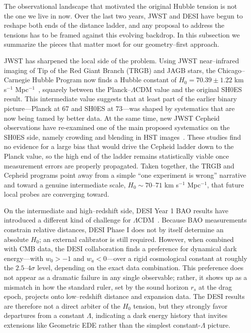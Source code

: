 \documentclass[a4paper,11pt]{article}
\begin{document}
The observational landscape that motivated the original Hubble tension is not the one we live in now. Over the last two years, JWST and DESI have begun to reshape both ends of the distance ladder, and any proposal to address the tensions has to be framed against this evolving backdrop. In this subsection we summarize the pieces that matter most for our geometry--first approach.

JWST has sharpened the local side of the problem. Using JWST near--infrared imaging of Tip of the Red Giant Branch (TRGB) and JAGB stars, the Chicago--Carnegie Hubble Program now finds a Hubble constant of $H_0 = 70.39 \pm 1.22$ km s$^{-1}$ Mpc$^{-1}$~\cite{Freedman2024}, squarely between the Planck--$\Lambda$CDM value and the original SH0ES result. This intermediate value suggests that at least part of the earlier binary picture---Planck at 67 and SH0ES at 73---was shaped by systematics that are now being tamed by better data. At the same time, new JWST Cepheid observations have re-examined one of the main proposed systematics on the SH0ES side, namely crowding and blending in HST images~\cite{Riess_JWST}. These studies find no evidence for a large bias that would drive the Cepheid ladder down to the Planck value, so the high end of the ladder remains statistically viable once measurement errors are properly propagated. Taken together, the TRGB and Cepheid programs point away from a simple ``one experiment is wrong'' narrative and toward a genuine intermediate scale, $H_0 \sim 70$--$71$ km s$^{-1}$ Mpc$^{-1}$, that future local probes are converging toward.

On the intermediate and high--redshift side, DESI Year 1 BAO results have introduced a different kind of challenge for $\Lambda$CDM~\cite{DESI2024,DESI_cosmo}. Because BAO measurements constrain relative distances, DESI Phase I does not by itself determine an absolute $H_0$; an external calibrator is still required. However, when combined with CMB data, the DESI collaboration finds a preference for dynamical dark energy---with $w_0 > -1$ and $w_a < 0$---over a rigid cosmological constant at roughly the $2.5$--$4\sigma$ level, depending on the exact data combination. This preference does not appear as a dramatic failure in any single observable; rather, it shows up as a mismatch in how the standard ruler, set by the sound horizon $r_s$ at the drag epoch, projects onto low--redshift distance and expansion data. The DESI results are therefore not a direct arbiter of the $H_0$ tension, but they strongly favor departures from a constant $\Lambda$, indicating a dark energy history that invites extensions like Geometric EDE rather than the simplest constant-$\Lambda$ picture.
\end{document}

